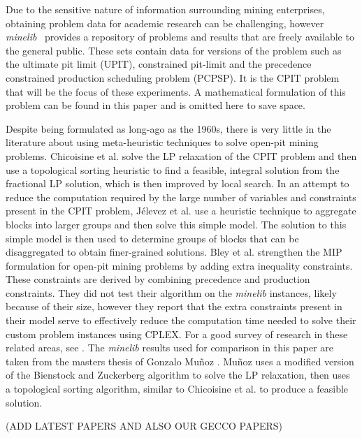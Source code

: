 \documentclass[journal]{IEEEtran}
\begin{document}
Due to the sensitive nature of information surrounding mining enterprises, obtaining problem data for academic research can be challenging, however \emph{minelib}~\cite{minelib} provides a repository of problems and results that are freely available to the general public. These sets contain data for versions of the problem such as the ultimate pit limit (UPIT), constrained pit-limit and the precedence constrained production scheduling problem (PCPSP). It is the CPIT problem that will be the focus of these experiments. A mathematical formulation of this problem can be found in this paper and is omitted here to save space.


Despite being formulated as long-ago as the 1960s, there is very little in the literature about using meta-heuristic techniques to solve open-pit mining problems. Chicoisine et al. \cite{cpit} solve the LP relaxation of the CPIT problem and then use a topological sorting heuristic to find a feasible, integral solution from the fractional LP solution, which is then improved by local search.
%
In an attempt to reduce the computation required by the large number of variables and constraints present in the CPIT problem, J\'elevez et al. \cite{aggregate} use a heuristic technique to aggregate blocks into larger groups and then solve this simple model. The solution to this simple model is then used to determine groups of blocks that can be disaggregated to obtain finer-grained solutions.
%
Bley et al. strengthen the MIP formulation for open-pit mining problems by adding extra inequality constraints. These constraints are derived by combining precedence and production constraints. They did not test their algorithm on the \emph{minelib} instances, likely because of their size, however they report that the extra constraints present in their model serve to effectively reduce the computation time needed to solve their custom problem instances using CPLEX. For a good survey of research in these related areas, see \cite{hochbaum,meagher}.
%
The \emph{minelib} results used for comparison in this paper are taken from the masters thesis of Gonzalo Mu\~noz \cite{toposort}. Mu\~noz uses a modified version of the Bienstock and Zuckerberg algorithm \cite{bz} to solve the LP relaxation, then uses a topological sorting algorithm, similar to Chicoisine et al. to produce a feasible solution.

(ADD LATEST PAPERS AND ALSO OUR GECCO PAPERS)

\end{document}
